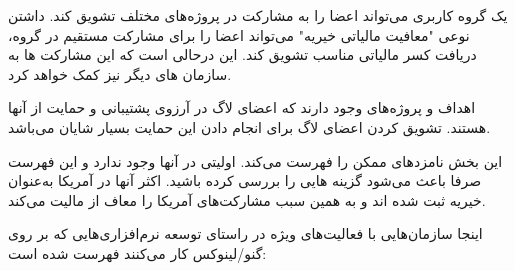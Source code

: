 یک گروه کاربری می‌تواند اعضا را به مشارکت در پروژه‌های مختلف تشویق کند.
داشتن نوعی "معافیت مالیاتی خیریه" می‌تواند اعضا را برای مشارکت مستقیم در گروه،
دریافت کسر مالیاتی مناسب تشویق کند. این درحالی است که این مشارکت ها
به سازمان های دیگر نیز کمک خواهد کرد.

اهداف و پروژه‌های وجود دارند که اعضای لاگ در آرزوی پشتیبانی و حمایت از آنها هستند.
تشویق کردن اعضای لاگ برای انجام دادن این حمایت بسیار شایان می‌باشد.

این بخش نامزد‌های ممکن را فهرست می‌کند. اولیتی در آنها وجود ندارد و این فهرست
صرفا باعث می‌شود گزینه هایی را بررسی کرده باشید. اکثر آنها در آمریکا به‌عنوان
خیریه ثبت شده اند و به همین سبب مشارکت‌های آمریکا را معاف از مالیت می‌کند.

اینجا سازمان‌هایی با فعالیت‌های ویژه در راستای توسعه نرم‌افزاری‌هایی که
بر روی گنو/لینوکس کار می‌کنند فهرست شده است:

